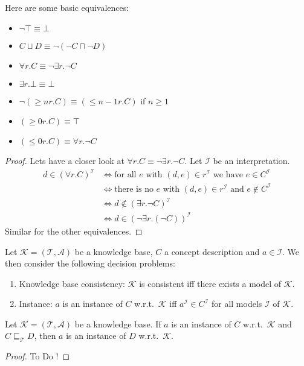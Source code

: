 \begin{lemma}
	Here are some basic equivalences:
	\begin{itemize}
		\item $\neg \top \equiv \bot$
		\item $C \sqcup D \equiv \neg \left( \neg C \sqcap \neg D \right)$
		\item $\forall r.C \equiv \neg \exists r.\neg C$
		\item $\exists r.\bot \equiv \bot$
		\item $\neg \left( \geq nr.C \right) \equiv \left( \leq n-1 r.C \right)$ if $n \geq 1$
		\item $\left( \geq 0 r.C \right) \equiv \top$
		\item $\left( \leq 0r.C \right) \equiv \forall r.\neg C$
	 \end{itemize}
\end{lemma}
\begin{proof}
	Lets have a closer look at $\forall r.C \equiv \neg \exists r.\neg C $.
	Let $\mathcal{I}$ be an interpretation.
	\begin{align*}
		d \in \left( \forall r.C \right)^{\mathcal{I}} & \iff \text{for all $e$ with $(d,e)\in r^{\mathcal{I}}$ we have $e \in C^{\mathcal{I}}$} \\
							& \iff \text{there is no $e$ with $(d,e)\in r^{\mathcal{I}}$ and $e \notin C^{\mathcal{I}}$} \\
							& \iff d  \notin \left( \exists r.\neg C \right)^{\mathcal{I}} \\
							& \iff d \in \left( \neg \exists r.(\neg C) \right)^{\mathcal{I}}
	\end{align*}
	Similar for the other equivalences. \qedhere
\end{proof}

\begin{definition}
	Let $\mathcal{K} = \left( \mathcal{T}, \mathcal{A} \right)$ be a knowledge base, 
	$C$ a concept description and $a \in \mathscr{I}$.
	We then consider the following decision problems:
	\begin{enumerate}
		\item Knowledge base consistency: $\mathcal{K}$ is consistent iff there exists a model of $\mathcal{K}$.
		\item Instance: $a$ is an instance of $C$ w.r.t.\ $\mathcal{K}$ iff $a^{\mathcal{I}} \in C^{\mathcal{I}}$ 
			for all models $\mathcal{I}$ of $\mathcal{K}$.
	\end{enumerate}
\end{definition}
\begin{lemma}
	Let $\mathcal{K} = \left( \mathcal{T}, \mathcal{A} \right)$ be a knowledge base.
	If $a$ is an instance of $C$ w.r.t.\ $\mathcal{K}$ and $C \sqsubseteq_{\mathcal{T}} D$,
	then $a$ is an instance of $D$ w.r.t.\ $\mathcal{K}$.
\end{lemma}
\begin{proof}
	To Do !
\end{proof}

